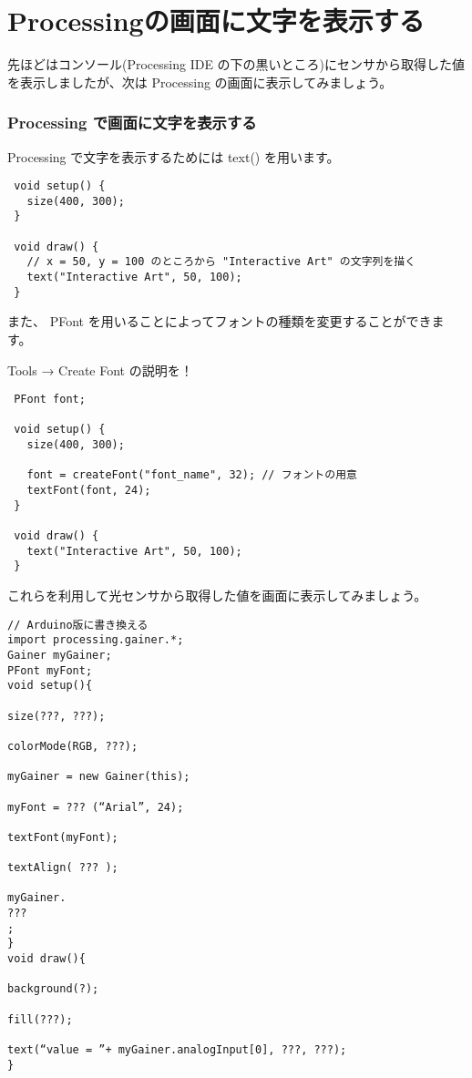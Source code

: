 \documentclass[11pt,a4paper]{jarticle}
\begin{document}
\section{Processingの画面に文字を表示する}
先ほどはコンソール(Processing IDE の下の黒いところ)にセンサから取得した値を表示しましたが、次は Processing の画面に表示してみましょう。

\subsubsection*{Processing で画面に文字を表示する}
Processing で文字を表示するためには text() を用います。
\begin{lstlisting}
 void setup() {
   size(400, 300);
 }

 void draw() {
   // x = 50, y = 100 のところから "Interactive Art" の文字列を描く
   text("Interactive Art", 50, 100);
 }
\end{lstlisting}

また、 PFont を用いることによってフォントの種類を変更することができます。

Tools → Create Font の説明を！

\begin{lstlisting}
 PFont font;

 void setup() {
   size(400, 300);
 
   font = createFont("font_name", 32); // フォントの用意
   textFont(font, 24);
 }

 void draw() {
   text("Interactive Art", 50, 100);
 }
\end{lstlisting}

これらを利用して光センサから取得した値を画面に表示してみましょう。

\begin{lstlisting}
// Arduino版に書き換える
import processing.gainer.*;
Gainer myGainer;
PFont myFont;
void setup(){
	
size(???, ???);
	
colorMode(RGB, ???);
	
myGainer = new Gainer(this);
	
myFont = ??? (“Arial”, 24);
	
textFont(myFont);
	
textAlign( ??? );
	
myGainer.
???
;
}
void draw(){
	
background(?);
	
fill(???);
	
text(“value = ”+ myGainer.analogInput[0], ???, ???);
}
\end{lstlisting}
\end{document}
